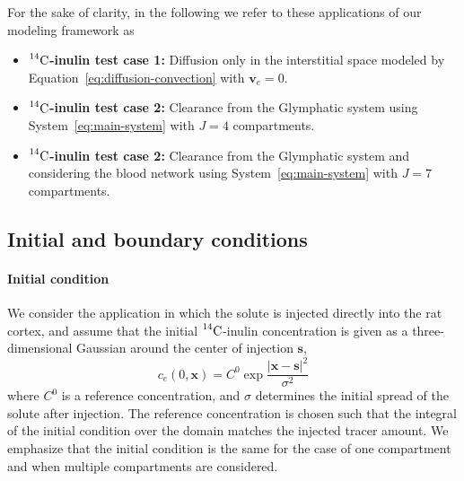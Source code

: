 \documentclass[10pt,letterpaper]{article}
\newcommand{\ie}{\emph{i.e.}\;}
\newcommand{\1}{^{(1)}}
\newcommand{\2}{^{(2)}}
\newcommand {\x}   {\mathbf{x}}
\newcommand {\vel}   {\mathbf{v}}
\newcommand{\Cinulin}{$\prescript{14}{}{\text{C}}$-inulin }
\begin{document}
For the sake of clarity, in the following we refer to these applications of our modeling framework as
\begin{itemize}
    \item \textbf{\Cinulin test case 1:} Diffusion only in the interstitial space modeled by Equation~\eqref{eq:diffusion-convection} with $\vel_e = 0$. 
    \item \textbf{\Cinulin test case 2:} Clearance from the Glymphatic system using System~\eqref{eq:main-system} with $J=4$ compartments. 
    \item \textbf{\Cinulin test case 2:} Clearance from the Glymphatic system and considering the blood network using System~\eqref{eq:main-system} with $J=7$ compartments. 
\end{itemize}



\subsection{Initial and boundary conditions} \label{subsec:Init-bound}
\paragraph{Initial condition}

We consider the application in which the solute is injected directly into the rat cortex, and assume that the initial \Cinulin concentration is given as a three-dimensional Gaussian around the center of injection $ \mathbf{s} $,
\begin{equation}
    c_e(0, \x) = C^0 \exp{\frac{|\x - \mathbf{s}|^2}{\sigma^2}} 
    \label{eq:inulin-initial}
\end{equation}
where $C^0$ is a reference concentration, and $ \sigma $ determines the initial spread of the solute after injection. The reference concentration is chosen such that the integral of the initial condition over the domain matches the injected tracer amount. We emphasize that the initial condition is the same for the case of one compartment and when multiple compartments are considered.  

\end{document}
